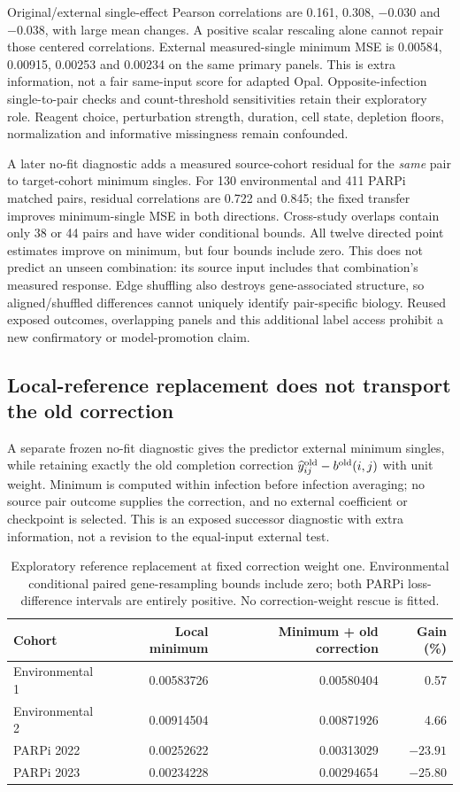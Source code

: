 Original/external single-effect Pearson correlations are 0.161, 0.308, $-0.030$ and $-0.038$, with large mean changes. A positive scalar rescaling alone cannot repair those centered correlations. External measured-single minimum MSE is 0.00584, 0.00915, 0.00253 and 0.00234 on the same primary panels. This is extra information, not a fair same-input score for adapted Opal. Opposite-infection single-to-pair checks and count-threshold sensitivities retain their exploratory role. Reagent choice, perturbation strength, duration, cell state, depletion floors, normalization and informative missingness remain confounded.

A later no-fit diagnostic adds a measured source-cohort residual for the \emph{same} pair to target-cohort minimum singles. For 130 environmental and 411 PARPi matched pairs, residual correlations are 0.722 and 0.845; the fixed transfer improves minimum-single MSE in both directions. Cross-study overlaps contain only 38 or 44 pairs and have wider conditional bounds. All twelve directed point estimates improve on minimum, but four bounds include zero. This does not predict an unseen combination: its source input includes that combination's measured response. Edge shuffling also destroys gene-associated structure, so aligned/shuffled differences cannot uniquely identify pair-specific biology. Reused exposed outcomes, overlapping panels and this additional label access prohibit a new confirmatory or model-promotion claim.

\subsection{Local-reference replacement does not transport the old correction}
A separate frozen no-fit diagnostic gives the predictor external minimum singles, while retaining exactly the old completion correction $\widehat y^{\rm old}_{ij}-b^{\rm old}(i,j)$ with unit weight. Minimum is computed within infection before infection averaging; no source pair outcome supplies the correction, and no external coefficient or checkpoint is selected. This is an exposed successor diagnostic with extra information, not a revision to the equal-input external test.

\begin{table}[htbp]\centering\small
\begin{tabular}{lrrr}\toprule
Cohort & Local minimum & Minimum + old correction & Gain (\%)\\\midrule
Environmental 1 & 0.00583726 & 0.00580404 & 0.57\\
Environmental 2 & 0.00914504 & 0.00871926 & 4.66\\
PARPi 2022 & 0.00252622 & 0.00313029 & $-23.91$\\
PARPi 2023 & 0.00234228 & 0.00294654 & $-25.80$\\\bottomrule
\end{tabular}
\caption{Exploratory reference replacement at fixed correction weight one. Environmental conditional paired gene-resampling bounds include zero; both PARPi loss-difference intervals are entirely positive. No correction-weight rescue is fitted.}
\label{tab:growth-reference-swap}\end{table}

